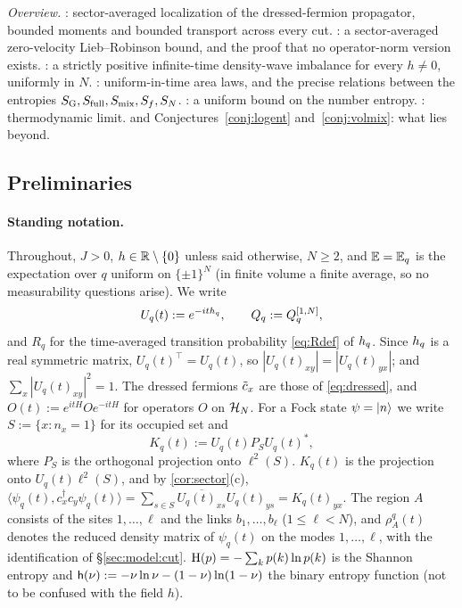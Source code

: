 \emph{Overview.}
: sector-averaged localization of the dressed-fermion propagator, bounded
moments and bounded transport across every cut.
: a sector-averaged zero-velocity Lieb--Robinson bound, and the proof that no
operator-norm version exists.
: a strictly positive infinite-time density-wave imbalance for every $h\neq0$,
uniformly in $N$.
: uniform-in-time area laws, and the precise relations between the
entropies $S_{\mathrm{G}},S_{\mathrm{full}},S_{\mathrm{mix}},S_{f},S_{N}$.
: a uniform bound on the number entropy.
: thermodynamic limit.
 and Conjectures~\ref{conj:logent} and~\ref{conj:volmix}: what lies beyond.

\subsection{Preliminaries}\label{sec:main:prelim}

\paragraph{Standing notation.}
Throughout, $J>0$, $h\in\mathbb{R}\setminus\{0\}$ unless said otherwise, $N\ge2$, and $\mathbb{E}=\mathbb{E}_q$ is the
expectation over $q$ uniform on $\{\pm1\}^N$ (in finite volume a finite average, so no measurability
questions arise).  We write
\[
  U_q(t):=e^{-ith_{q}},\qquad Q_q:=Q^{[1,N]}_q,
\]
and $R_q$ for the time-averaged transition probability \eqref{eq:Rdef} of $h_{q}$.  Since $h_{q}$ is a
real symmetric matrix, $U_q(t)^{\top}=U_q(t)$, so $|U_q(t)_{xy}|=|U_q(t)_{yx}|$; and
$\sum_x|U_q(t)_{xy}|^2=1$.  The dressed fermions $\tilde c_x$ are those of \eqref{eq:dressed}, and
$O(t):=e^{itH}Oe^{-itH}$ for operators $O$ on $\mathcal{H}_N$.  For a Fock state $\psi=|n\rangle$ we write
$S:=\{x:n_x=1\}$ for its occupied set and
\begin{equation}\label{eq:main-K}
  K_q(t):=U_q(t)P_SU_q(t)^*,
\end{equation}
where $P_S$ is the orthogonal projection onto $\ell^2(S)$.  $K_q(t)$ is the projection onto
$U_q(t)\ell^2(S)$, and by \cref{cor:sector}(c),
$\langle\psi_q(t),c_x^\dagger c_y\psi_q(t)\rangle=\sum_{s\in S}\overline{U_q(t)_{xs}}U_q(t)_{ys}=K_q(t)_{yx}$.
The region $A$ consists of the sites $1,\dots,\ell$ and the links $b_1,\dots,b_\ell$ ($1\le\ell<N$), and
$\rho^q_A(t)$ denotes the reduced density matrix of $\psi_q(t)$ on the modes $1,\dots,\ell$, with the
identification of \S\ref{sec:model:cut}.  $\mathrm{H}(p)=-\sum_kp(k)\ln p(k)$ is the Shannon entropy and
$\mathsf{h}(\nu):=-\nu\ln\nu-(1-\nu)\ln(1-\nu)$ the binary entropy function (not to be confused with the
field $h$).

